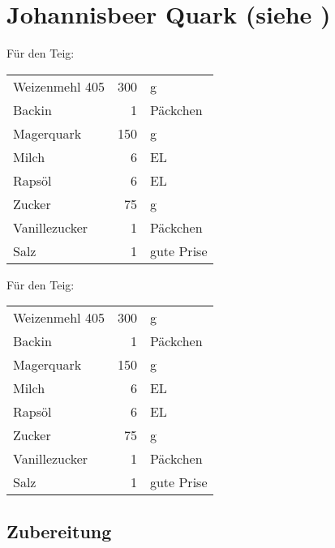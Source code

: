 \section{Johannisbeer Quark \textmd{(siehe \cite[172]{OetkerBackenMachtFreude1992})}}
Für den Teig:\\
\begin{tabular}{lrl}
    Weizenmehl 405 & 300 &          g \\
    Backin         &   1 &   Päckchen \\
    Magerquark     & 150 &          g \\
    Milch          &   6 &         EL \\
    Rapsöl         &   6 &         EL \\
    Zucker         &  75 &          g \\
    Vanillezucker  &   1 &   Päckchen \\
    Salz           &   1 & gute Prise
\end{tabular} 
Für den Teig:\\
\begin{tabular}{lrl}
    Weizenmehl 405 & 300 &          g \\
    Backin         &   1 &   Päckchen \\
    Magerquark     & 150 &          g \\
    Milch          &   6 &         EL \\
    Rapsöl         &   6 &         EL \\
    Zucker         &  75 &          g \\
    Vanillezucker  &   1 &   Päckchen \\
    Salz           &   1 & gute Prise
\end{tabular} 


\subsection*{Zubereitung}


